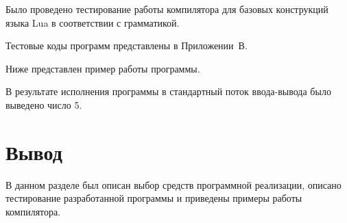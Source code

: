 Было проведено тестирование работы компилятора для базовых конструкций языка Lua в соответствии с грамматикой.

Тестовые коды программ представлены в Приложении~В.

Ниже представлен пример работы программы.



В результате исполнения программы в стандартный поток ввода-вывода было выведено число 5.

\section{Вывод}
В данном разделе был описан выбор средств программной реализации, описано тестирование разработанной программы и приведены примеры работы компилятора.







